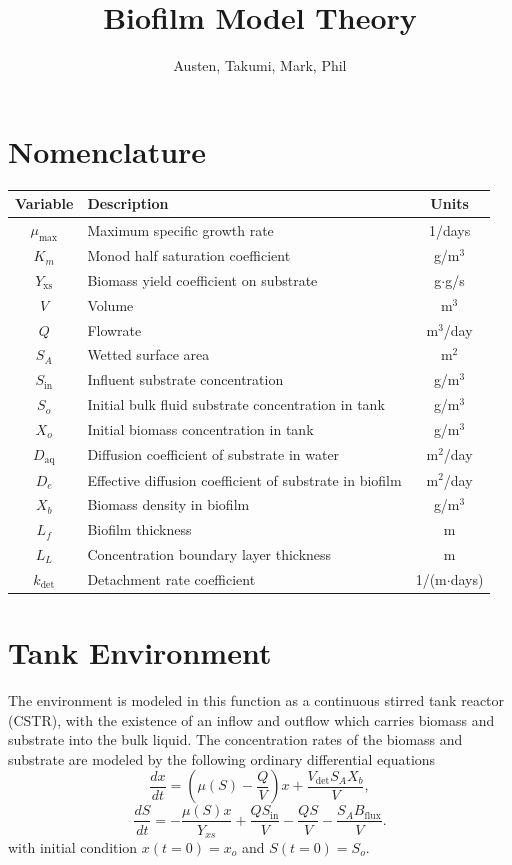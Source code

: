 \documentclass[letterpaper, twoside]{article}
\title{Biofilm Model Theory}
\author{Austen, Takumi, Mark, Phil}
\date{}
\numberwithin{equation}{section}
\begin{document}
\maketitle
{}

\section{Nomenclature}
\begin{tabular}{c l c}
  Variable & Description & Units\\ \hline
  $\mu_\mathrm{max}$  & Maximum specific growth rate & 1/days\\
  $K_m$ & Monod half saturation coefficient & g/m$^3$\\
  $Y_\mathrm{xs}$ & Biomass yield coefficient on substrate & g$\cdot$g/s\\
  $V$ & Volume &m$^3$ \\
  $Q$	& Flowrate & m$^3$/day\\
  $S_A$	& Wetted surface area & m$^2$\\
  $S_{\mathrm{in}}$ & Influent substrate concentration &  g/m$^3$ \\
  $S_o$ & Initial bulk fluid substrate concentration in tank &  g/m$^3$ \\
  $X_o$ & Initial biomass concentration in tank &  g/m$^3$ \\
  $D_\mathrm{aq}$ & Diffusion coefficient of substrate in water & m$^2$/day \\
  $D_e$ & Effective diffusion coefficient of substrate in biofilm & m$^2$/day \\
  $X_b$ & Biomass density in biofilm &  g/m$^3$ \\
  $L_{f}$ & Biofilm thickness & m\\
  $L_L$ & Concentration boundary layer thickness & m \\
  $k_\mathrm{det}$ &	Detachment rate coefficient & 1/(m$\cdot$days)
\end{tabular}

\section{Tank Environment}
The environment is modeled in this function as a continuous stirred tank reactor (CSTR), with the existence of an inflow and outflow which carries biomass and substrate into the bulk liquid. The concentration rates of the biomass and substrate are modeled by the following ordinary differential equations
\begin{equation} \label{eq: BiomassEquation}
  \frac{dx}{dt} = \left(\mu(S) - \frac{Q}{V}\right) x +\frac{ V_{\mathrm{det}} S_A X_b}{V},
\end{equation}
\begin{equation} \label{eq: SubstrateEquation}
  \frac{dS}{dt} = -\frac{\mu(S) x}{Y_{xs}} + \frac{Q S_{\mathrm{in}}}{V} - \frac{Q S}{V} - \frac{S_A B_{\mathrm{flux}}}{V}.
\end{equation}
with initial condition $x(t=0)=x_o$ and $S(t=0)=S_o$.
\end{document}

